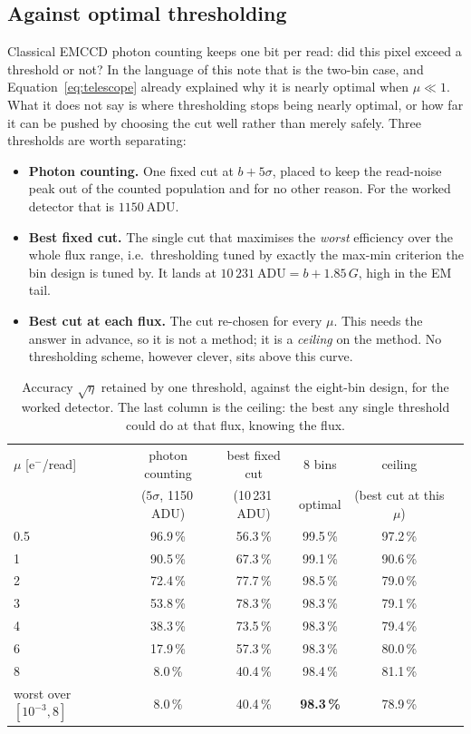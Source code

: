 \documentclass[11pt,a4paper]{article}
\newcommand{\ADU}{\ensuremath{\mathrm{ADU}}}
\newcommand{\eminus}{\ensuremath{\mathrm{e}^-}}
\begin{document}
\subsection{Against optimal thresholding}
\label{sec:thresholding}

Classical EMCCD photon counting keeps one bit per read: did this pixel exceed a
threshold or not? In the language of this note that is the two-bin case, and
Equation~\eqref{eq:telescope} already explained why it is nearly optimal when
$\mu \ll 1$. What it does not say is where thresholding stops being nearly
optimal, or how far it can be pushed by choosing the cut well rather than
merely safely. Three thresholds are worth separating:

\begin{itemize}\itemsep2pt
\item \textbf{Photon counting.} One fixed cut at $b + 5\sigma$, placed to keep
      the read-noise peak out of the counted population and for no other
      reason. For the worked detector that is $1150\ \ADU$.
\item \textbf{Best fixed cut.} The single cut that maximises the \emph{worst}
      efficiency over the whole flux range, i.e.\ thresholding tuned by exactly
      the max-min criterion the bin design is tuned by. It lands at
      $10\,231\ \ADU = b + 1.85\,G$, high in the EM tail.
\item \textbf{Best cut at each flux.} The cut re-chosen for every $\mu$. This
      needs the answer in advance, so it is not a method; it is a \emph{ceiling}
      on the method. No thresholding scheme, however clever, sits above this
      curve.
\end{itemize}

\begin{table}[h]
\centering
\small
\caption{Accuracy $\sqrt{\eta}$ retained by one threshold, against the eight-bin
design, for the worked detector. The last column is the ceiling: the best any
single threshold could do at that flux, knowing the flux.}
\label{tab:threshold}
\begin{tabular}{lccccc}
\toprule
$\mu$ [\eminus/read] & photon counting & best fixed cut & 8 bins & ceiling\\
                     & ($5\sigma$, 1150\,\ADU) & (10\,231\,\ADU) & optimal & (best cut at this $\mu$)\\
\midrule
0.5 & 96.9\,\% & 56.3\,\% & 99.5\,\% & 97.2\,\%\\
1   & 90.5\,\% & 67.3\,\% & 99.1\,\% & 90.6\,\%\\
2   & 72.4\,\% & 77.7\,\% & 98.5\,\% & 79.0\,\%\\
3   & 53.8\,\% & 78.3\,\% & 98.3\,\% & 79.1\,\%\\
4   & 38.3\,\% & 73.5\,\% & 98.3\,\% & 79.4\,\%\\
6   & 17.9\,\% & 57.3\,\% & 98.3\,\% & 80.0\,\%\\
8   &  8.0\,\% & 40.4\,\% & 98.4\,\% & 81.1\,\%\\
\midrule
worst over $[10^{-3},8]$ & 8.0\,\% & 40.4\,\% & \textbf{98.3\,\%} & 78.9\,\%\\
\bottomrule
\end{tabular}
\end{table}
\end{document}
